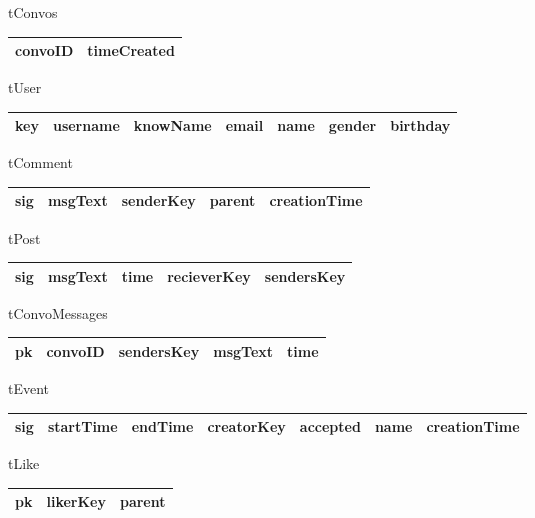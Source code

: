 \begin{enumerate}
tConvos
\begin{center}
    \begin{tabular}{ | l | l |}
    \hline
    convoID & timeCreated \\ \hline
    \end{tabular}
\end{center}

tUser
\begin{center}
    \begin{tabular}{ | l | l | l | l | l | l | l |}
    \hline
    key & username & knowName & email & name & gender & birthday \\ \hline
    \end{tabular}
\end{center}

tComment
\begin{center}
    \begin{tabular}{ | l | l | l | l | l |}
    \hline
    sig & msgText & senderKey & parent & creationTime \\ \hline
    \end{tabular}
\end{center}

tPost
\begin{center}
    \begin{tabular}{ | l | l | l | l | l |}
    \hline
    sig & msgText & time & recieverKey & sendersKey  \\ \hline
    \end{tabular}
\end{center}

tConvoMessages
\begin{center}
    \begin{tabular}{ | l | l | l | l | l |}
    \hline
    pk & convoID & sendersKey & msgText & time\\ \hline
    \end{tabular}
\end{center}

tEvent
\begin{center}
    \begin{tabular}{ | l | l | l | l | l | l | l |}
    \hline
    sig & startTime & endTime & creatorKey & accepted & name & creationTime \\ \hline
    \end{tabular}
\end{center}

tLike
\begin{center}
    \begin{tabular}{ | l | l | l |}
    \hline
    pk & likerKey & parent \\ \hline
    \end{tabular}
\end{center}


\end{enumerate}
